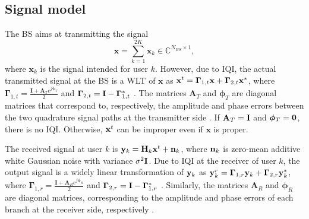 \documentclass[a4, conference]{IEEEtran}
\theoremstyle{definition}
\begin{document}
\subsection{Signal model}
The BS aims at transmitting the signal  
\begin{equation}
\mathbf{x}=\sum_{k=1}^{2K}\mathbf{x}_{k}%
\in\mathbb{C}^{N_{BS}\times 1},
\end{equation}
 where $\mathbf{x}_{k}$ is the signal intended for user $k$. 
However, due to IQI,   the actual transmitted signal at the BS is 
a WLT of $\mathbf{x}$ as ${\bf x}^t=\mathbf{\Gamma}_{1,t}{\bf x}+\mathbf{\Gamma}_{2,t}{\bf x}^*$, where $\mathbf{\Gamma}_{1,t}=\frac{\mathbf{I}+\mathbf{A}_Te^{j \bm{\phi}_T}}{2}$ and $\mathbf{\Gamma}_{2,t}={\bf I}-\mathbf{\Gamma}_{1,t}^*$  \cite{soleymani2020improper}. 
The matrices $\mathbf{A}_T$ and $\bm{\phi}_T$ are diagonal matrices that correspond to, respectively, the amplitude and phase errors between the two quadrature signal paths at the transmitter side \cite{javed2019multiple}. If $\mathbf{A}_T={\bf I}$ and $\bm{\phi}_T={\bf 0}$, there is no IQI. Otherwise, ${\bf x}^t$ can be improper even if $\mathbf{x}$ is proper.

The received signal at user $k$ is
${\bf y}_{k}
=
{\mathbf{H}_{k}\mathbf{x}^t
}
+
{{\bf n}_{k}}%
$,
where 
 ${\bf n}_{k}$ is zero-mean   additive  white Gaussian noise with variance $\sigma^2{\bf I}$. 
 Due to IQI at  the receiver of user $k$, the output signal is a widely linear transformation of ${\bf y}_{k}$ as ${\bf y}^r_k=\mathbf{\Gamma}_{1,r}{\bf y}_k+\mathbf{\Gamma}_{2,r}{\bf y}^*_k$, where $\mathbf{\Gamma}_{1,r}=\frac{\mathbf{I}+\mathbf{A}_Re^{j \bm{\phi}_R}}{2}$ and $\mathbf{\Gamma}_{2,r}={\bf I}-\mathbf{\Gamma}_{1,r}^*$  \cite{soleymani2020improper}. 
Similarly, the matrices $\mathbf{A}_R$ and $\bm{\phi}_R$ are diagonal matrices, corresponding to the amplitude and phase errors of each branch at the receiver side, respectively \cite{javed2019multiple}.
\end{document}
